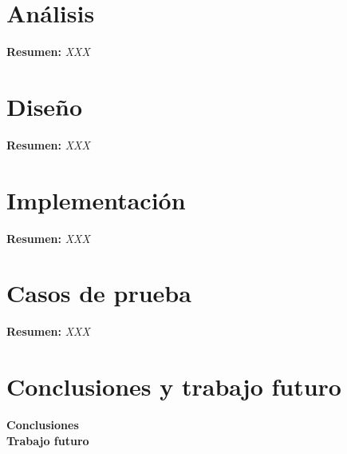 \documentclass[12pt,a4paper, twoside]{report}
\begin{document}
	\chapter{Análisis} \label{analysisChapter}
	
	\textbf{Resumen:} \textit{XXX}
	
	\chapter{Diseño} \label{designChapter}
	
	\textbf{Resumen:} \textit{XXX}
	
	\chapter{Implementación} \label{implementationChapter}
	
	\textbf{Resumen:} \textit{XXX}
	
	\chapter{Casos de prueba} \label{testingChapter}
	
	\textbf{Resumen:} \textit{XXX}

	\chapter*{Conclusiones y trabajo futuro} \label{conclusions}
	
	{\Large\textbf{Conclusiones}} \\
			
	{\Large\textbf{Trabajo futuro}} \\
			
\end{document}
